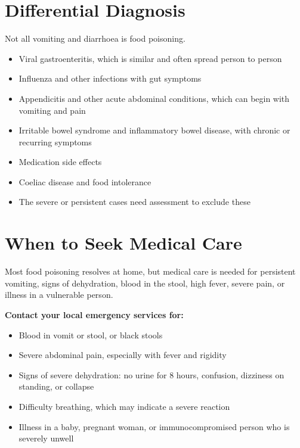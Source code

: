 \section*{Differential Diagnosis}
Not all vomiting and diarrhoea is food poisoning.
\begin{itemize}
    \item Viral gastroenteritis, which is similar and often spread person to person
    \item Influenza and other infections with gut symptoms
    \item Appendicitis and other acute abdominal conditions, which can begin with vomiting and pain
    \item Irritable bowel syndrome and inflammatory bowel disease, with chronic or recurring symptoms
    \item Medication side effects
    \item Coeliac disease and food intolerance
    \item The severe or persistent cases need assessment to exclude these
\end{itemize}

\section*{When to Seek Medical Care}
Most food poisoning resolves at home, but medical care is needed for persistent vomiting, signs of dehydration, blood in the stool, high fever, severe pain, or illness in a vulnerable person.

\textbf{Contact your local emergency services for:}
\begin{itemize}
    \item Blood in vomit or stool, or black stools
    \item Severe abdominal pain, especially with fever and rigidity
    \item Signs of severe dehydration: no urine for 8 hours, confusion, dizziness on standing, or collapse
    \item Difficulty breathing, which may indicate a severe reaction
    \item Illness in a baby, pregnant woman, or immunocompromised person who is severely unwell
\end{itemize}

